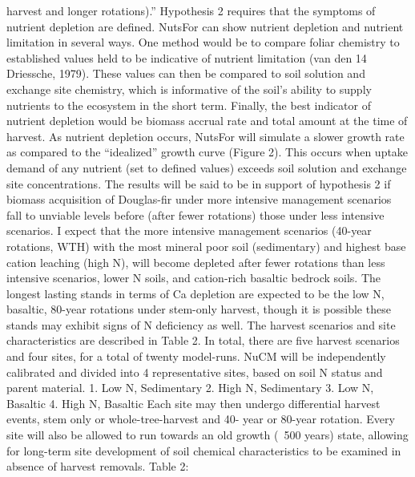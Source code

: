 \documentclass{article}
\begin{document}
harvest and longer rotations).”
Hypothesis 2 requires that the symptoms of nutrient depletion are defined. NutsFor can show
nutrient depletion and nutrient limitation in several ways. One method would be to compare
foliar chemistry to established values held to be indicative of nutrient limitation (van den 
14
Driessche, 1979). These values can then be compared to soil solution and exchange site
chemistry, which is informative of the soil’s ability to supply nutrients to the ecosystem in the
short term. Finally, the best indicator of nutrient depletion would be biomass accrual rate and
total amount at the time of harvest. As nutrient depletion occurs, NutsFor will simulate a slower
growth rate as compared to the “idealized” growth curve (Figure 2). This occurs when uptake
demand of any nutrient (set to defined values) exceeds soil solution and exchange site
concentrations. The results will be said to be in support of hypothesis 2 if biomass acquisition of
Douglas-fir under more intensive management scenarios fall to unviable levels before (after
fewer rotations) those under less intensive scenarios. I expect that the more intensive
management scenarios (40-year rotations, WTH) with the most mineral poor soil (sedimentary)
and highest base cation leaching (high N), will become depleted after fewer rotations than less
intensive scenarios, lower N soils, and cation-rich basaltic bedrock soils. The longest lasting
stands in terms of Ca depletion are expected to be the low N, basaltic, 80-year rotations under
stem-only harvest, though it is possible these stands may exhibit signs of N deficiency as well.
The harvest scenarios and site characteristics are described in Table 2. In total, there are five
harvest scenarios and four sites, for a total of twenty model-runs.
NuCM will be independently calibrated and divided into 4 representative sites, based on soil N
status and parent material.
1. Low N, Sedimentary
2. High N, Sedimentary
3. Low N, Basaltic
4. High N, Basaltic
Each site may then undergo differential harvest events, stem only or whole-tree-harvest and 40-
year or 80-year rotation. Every site will also be allowed to run towards an old growth (~500
years) state, allowing for long-term site development of soil chemical characteristics to be
examined in absence of harvest removals.
Table 2:
\end{document}
